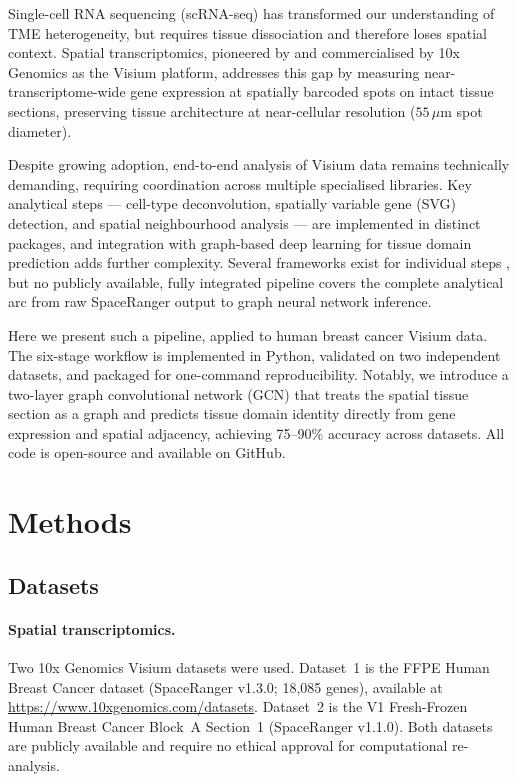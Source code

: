 \documentclass[12pt, a4paper]{article}
\begin{document}
Single-cell RNA sequencing (scRNA-seq) has transformed our understanding of
TME heterogeneity, but requires tissue dissociation and therefore loses spatial
context. Spatial transcriptomics, pioneered by \citet{stahl2016} and
commercialised by 10x Genomics as the Visium platform, addresses this gap by
measuring near-transcriptome-wide gene expression at spatially barcoded spots
on intact tissue sections, preserving tissue architecture at near-cellular
resolution ($55\,\mu$m spot diameter).

Despite growing adoption, end-to-end analysis of Visium data remains technically
demanding, requiring coordination across multiple specialised libraries. Key
analytical steps --- cell-type deconvolution, spatially variable gene (SVG)
detection, and spatial neighbourhood analysis --- are implemented in distinct
packages, and integration with graph-based deep learning for tissue domain
prediction adds further complexity. Several frameworks exist for individual steps
\citep{kleshchevnikov2022, palla2022}, but no publicly available, fully
integrated pipeline covers the complete analytical arc from raw SpaceRanger
output to graph neural network inference.

Here we present such a pipeline, applied to human breast cancer Visium data. The
six-stage workflow is implemented in Python, validated on two independent
datasets, and packaged for one-command reproducibility. Notably, we introduce a
two-layer graph convolutional network (GCN) \citep{kipf2017} that treats the
spatial tissue section as a graph and predicts tissue domain identity directly
from gene expression and spatial adjacency, achieving 75--90\% accuracy across
datasets. All code is open-source and available on GitHub.

\section{Methods}

\subsection{Datasets}

\paragraph{Spatial transcriptomics.}
Two 10x Genomics Visium datasets were used. Dataset~1 is the FFPE Human Breast
Cancer dataset (SpaceRanger v1.3.0; 18,085 genes), available at
\url{https://www.10xgenomics.com/datasets}. Dataset~2 is the V1 Fresh-Frozen
Human Breast Cancer Block~A Section~1 (SpaceRanger v1.1.0). Both datasets are
publicly available and require no ethical approval for computational re-analysis.
\end{document}
